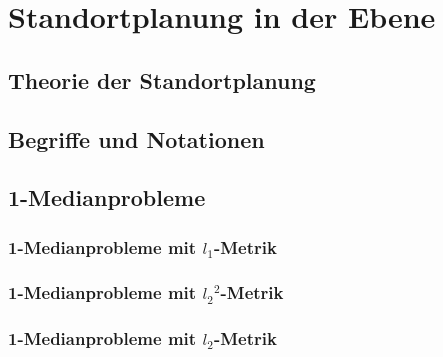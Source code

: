 \chapter{Standortplanung in der Ebene} %
\label{cha:standortplanung_in_der_ebene}


  \label{sec:standortplanung_in_der_ebene}

    \section{Theorie der Standortplanung} %
    \label{sec:theorie_der_standortplanung}
    

    \section{Begriffe und Notationen} %
    \label{sec:begriffe_und_symbole}
    

    \section{1-Medianprobleme} %
    \label{sec:1_medianprobleme}

      \subsection{1-Medianprobleme mit $l_1$-Metrik} %
      \label{sub:1_medianprobleme_mit_l1_Metrik}
      

      \subsection{1-Medianprobleme mit ${l_2}^{2}$-Metrik} %
      \label{sub:1_medianprobleme_mit_l2^2_Metrik}
      

      \subsection{1-Medianprobleme mit $l_2$-Metrik} %
      \label{sub:1_medianprobleme_mit_l2_Metrik}
      
    

